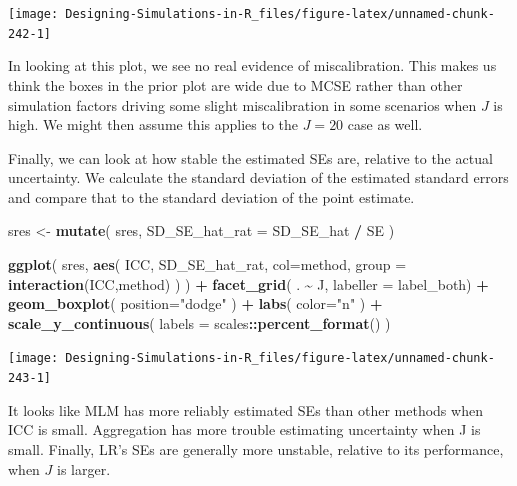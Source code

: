 \documentclass[
]{book}
\newenvironment{Shaded}{\begin{snugshade}}{\end{snugshade}}
\newcommand{\AttributeTok}[1]{\textcolor[rgb]{0.13,0.29,0.53}{#1}}
\newcommand{\FunctionTok}[1]{\textcolor[rgb]{0.13,0.29,0.53}{\textbf{#1}}}
\newcommand{\NormalTok}[1]{#1}
\newcommand{\OtherTok}[1]{\textcolor[rgb]{0.56,0.35,0.01}{#1}}
\newcommand{\SpecialCharTok}[1]{\textcolor[rgb]{0.81,0.36,0.00}{\textbf{#1}}}
\newcommand{\StringTok}[1]{\textcolor[rgb]{0.31,0.60,0.02}{#1}}
\begin{document}
\begin{center}\texttt{[image: Designing-Simulations-in-R\_files/figure-latex/unnamed-chunk-242-1]} \end{center}

In looking at this plot, we see no real evidence of miscalibration.
This makes us think the boxes in the prior plot are wide due to MCSE rather than other simulation factors driving some slight miscalibration in some scenarios when \(J\) is high.
We might then assume this applies to the \(J = 20\) case as well.

Finally, we can look at how stable the estimated SEs are, relative to the actual uncertainty.
We calculate the standard deviation of the estimated standard errors and compare that to the standard deviation of the point estimate.

\begin{Shaded}
\begin{Highlighting}[]
\NormalTok{sres }\OtherTok{\textless{}{-}} \FunctionTok{mutate}\NormalTok{( sres,}
               \AttributeTok{SD\_SE\_hat\_rat =}\NormalTok{ SD\_SE\_hat }\SpecialCharTok{/}\NormalTok{ SE )}

\FunctionTok{ggplot}\NormalTok{( sres,}
        \FunctionTok{aes}\NormalTok{( ICC, SD\_SE\_hat\_rat, }\AttributeTok{col=}\NormalTok{method,}
             \AttributeTok{group =} \FunctionTok{interaction}\NormalTok{(ICC,method) ) ) }\SpecialCharTok{+}
    \FunctionTok{facet\_grid}\NormalTok{( . }\SpecialCharTok{\textasciitilde{}}\NormalTok{ J, }\AttributeTok{labeller =}\NormalTok{ label\_both) }\SpecialCharTok{+}
  \FunctionTok{geom\_boxplot}\NormalTok{( }\AttributeTok{position=}\StringTok{"dodge"}\NormalTok{ ) }\SpecialCharTok{+}
  \FunctionTok{labs}\NormalTok{( }\AttributeTok{color=}\StringTok{"n"}\NormalTok{ ) }\SpecialCharTok{+}
  \FunctionTok{scale\_y\_continuous}\NormalTok{( }\AttributeTok{labels =}\NormalTok{ scales}\SpecialCharTok{::}\FunctionTok{percent\_format}\NormalTok{() ) }
\end{Highlighting}
\end{Shaded}

\begin{center}\texttt{[image: Designing-Simulations-in-R\_files/figure-latex/unnamed-chunk-243-1]} \end{center}

It looks like MLM has more reliably estimated SEs than other methods when ICC is small.
Aggregation has more trouble estimating uncertainty when J is small.
Finally, LR's SEs are generally more unstable, relative to its performance, when \(J\) is larger.
\end{document}
